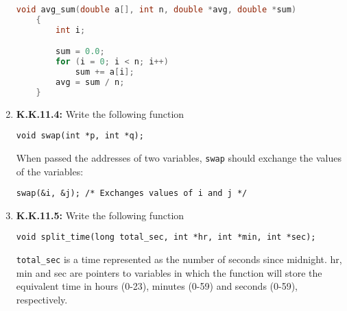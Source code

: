\documentclass[12pt]{article}
\begin{document}
\begin{enumerate}[1.]
\begin{lstlisting}[language=c]
    void avg_sum(double a[], int n, double *avg, double *sum)
    {
        int i;

        sum = 0.0;
        for (i = 0; i < n; i++)
            sum += a[i];
        avg = sum / n;
    }
\end{lstlisting}

    \item \textbf{K.K.11.4:} Write the following function

    \bigskip

    \texttt{void swap(int *p, int *q);}

    \bigskip

    When passed the addresses of two variables, \texttt{swap} should exchange the values of the variables:

    \bigskip

    \texttt{swap(\&i, \&j); /* Exchanges values of i and j */}

    \bigskip

    \item \textbf{K.K.11.5:} Write the following function

    \bigskip

    \texttt{void split\_time(long total\_sec, int *hr, int *min, int *sec);}

    \bigskip

    \texttt{total\_sec} is a time represented as the number of seconds since midnight.
    hr, min and sec are pointers to variables in which the function will store the
    equivalent time in hours (0-23), minutes (0-59) and seconds (0-59), respectively.


\end{enumerate}
\end{document}
